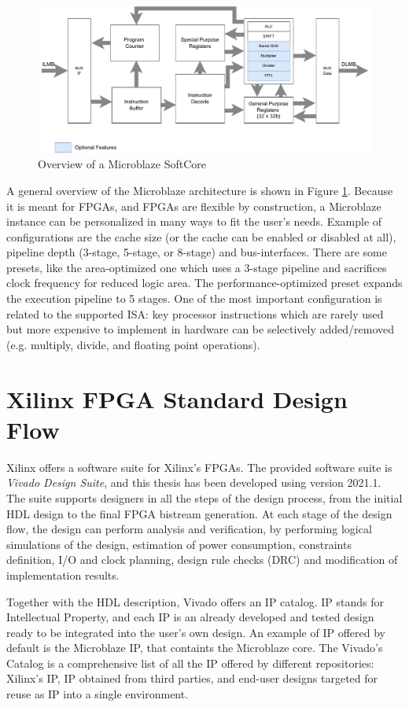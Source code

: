 \begin{figure}[H]
\centering
\includegraphics[width=0.8\linewidth]{images/chapter3/ublaze_arch.pdf}
\caption{\cite{anemaet2003microprocessor}Overview of a Microblaze SoftCore}
\label{fig:ublaze}
\end{figure}

A general overview of the Microblaze architecture is shown in Figure \ref{fig:ublaze}. Because it is meant for FPGAs, and FPGAs are flexible by construction, a Microblaze instance can be personalized in many ways to fit the user's needs. Example of configurations are the cache size (or the cache can be enabled or disabled at all), pipeline depth (3-stage, 5-stage, or 8-stage) and bus-interfaces. There are some presets, like the area-optimized one which uses a 3-stage pipeline and sacrifices clock frequency for reduced logic area. The performance-optimized preset expands the execution pipeline to 5 stages. One of the most important configuration is related to the supported ISA: key processor instructions which are rarely used but more expensive to implement in hardware can be selectively added/removed (e.g. multiply, divide, and floating point operations).

\section{Xilinx FPGA Standard Design Flow}

Xilinx offers a software suite for Xilinx's FPGAs. The provided software suite is \textit{Vivado Design Suite}, and this thesis has been developed using version 2021.1. The suite supports designers in all the steps of the design process, from the initial HDL design to the final FPGA bistream generation. At each stage of the design flow, the design can perform analysis and verification, by performing logical simulations of the design, estimation of power consumption, constraints definition, I/O and clock planning, design rule checks (DRC) and modification of implementation results.\bigskip

Together with the HDL description, Vivado offers an IP catalog. IP stands for Intellectual Property, and each IP is an already developed and tested design ready to be integrated into the user's own design. An example of IP offered by default is the Microblaze IP, that containts the Microblaze core. The Vivado's Catalog is a comprehensive list of all the IP offered by different repositories: Xilinx's IP, IP obtained from third parties, and end-user designs targeted for reuse as IP into a single environment. \bigskip

